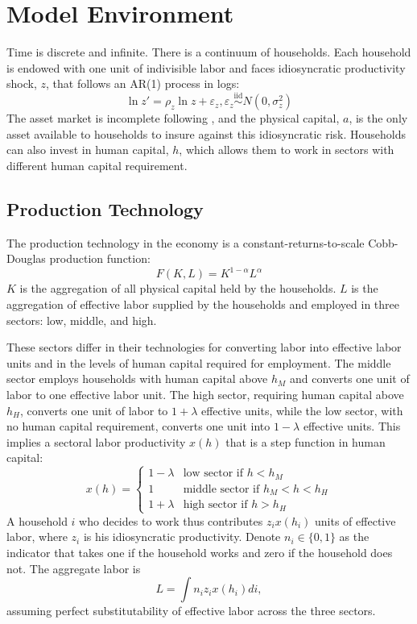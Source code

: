 \documentclass[12pt]{article}
\begin{document}
\section{Model Environment }
\label{sec:model}
Time is discrete and infinite. 
There is a continuum of households. Each household is endowed with one unit of indivisible labor and faces idiosyncratic productivity shock, $z$, that follows an AR(1) process in logs:
\begin{equation}
    \label{eq:z}
\ln z'=\rho_z\ln z + \varepsilon_z, \varepsilon_z \overset{\mathrm{iid}}{\sim} N(0,\sigma_z^2)
\end{equation}
The asset market is incomplete following \citet{aiyagari_uninsured_1994}, and the physical capital, $a$, is the only asset available to households to insure against this idiosyncratic risk. Households can also invest in human capital, $h$, which allows them to work in sectors with different human capital requirement.

\subsection{Production Technology}
The production technology in the economy is a constant-returns-to-scale Cobb-Douglas production function:
\begin{equation}
    F(K,L)=K^{1-\alpha} L^{\alpha}
\end{equation}
$K$ is the aggregation of all physical capital held by the households. $L$ is the aggregation of effective labor supplied by the households and employed in three sectors: low, middle, and high. 

These sectors differ in their technologies for converting labor into effective labor units and in the levels of human capital required for employment. 
The middle sector employs households with human capital above $h_M$ and converts one unit of labor to one effective labor unit. The high sector, requiring human capital above $h_H$, converts one unit of labor to $1+\lambda$ effective units, while the low sector, with no human capital requirement, converts one unit into $1-\lambda$ effective units. This implies a sectoral labor productivity $x(h)$ that is a step function in human capital:
\begin{equation}
    \label{eq:x}
x(h)=\left \{ 
\begin{array}{cl}
1-\lambda  & \text{low sector if }h<h_{M} \\ 
1 & \text{middle sector if }h_{M}<h<h_{H} \\ 
1+\lambda  & \text{high sector if }h>h_{H}%
\end{array}%
\right. 
\end{equation}
A household $i$ who decides to work thus contributes $z_ix(h_i)$ units of effective labor, where $z_i$ is his idiosyncratic productivity. Denote $n_i \in \{0,1\}$ as the indicator that takes one if the household works and zero if the household does not. The aggregate labor is
\begin{equation}
    L=\int n_iz_ix(h_i)di,
\end{equation}
assuming perfect substitutability of effective labor across the three sectors.
\end{document}
